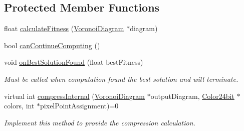 \subsection*{Protected Member Functions}
\begin{DoxyCompactItemize}
\item 
float \hyperlink{classlossycompressor_1_1_compressor_algorithm_af77bb3da1cfcf14c0bed2aa254c4fbd6}{calculate\+Fitness} (\hyperlink{structlossycompressor_1_1_voronoi_diagram}{Voronoi\+Diagram} $\ast$diagram)
\item 
bool \hyperlink{classlossycompressor_1_1_compressor_algorithm_a978361a0f3a5c36d3a82a6fe1b4c4d00}{can\+Continue\+Computing} ()
\item 
void \hyperlink{classlossycompressor_1_1_compressor_algorithm_ac7ce717ecc67256fbc99d9ab8a0569fe}{on\+Best\+Solution\+Found} (float best\+Fitness)\hypertarget{classlossycompressor_1_1_compressor_algorithm_ac7ce717ecc67256fbc99d9ab8a0569fe}{}\label{classlossycompressor_1_1_compressor_algorithm_ac7ce717ecc67256fbc99d9ab8a0569fe}

\begin{DoxyCompactList}\small\item\em Must be called when computation found the best solution and will terminate. \end{DoxyCompactList}\item 
virtual int \hyperlink{classlossycompressor_1_1_compressor_algorithm_a171b7c408749b37c5526fb6bca9e981e}{compress\+Internal} (\hyperlink{structlossycompressor_1_1_voronoi_diagram}{Voronoi\+Diagram} $\ast$output\+Diagram, \hyperlink{structlossycompressor_1_1_color24bit}{Color24bit} $\ast$colors, int $\ast$pixel\+Point\+Assignment)=0\hypertarget{classlossycompressor_1_1_compressor_algorithm_a171b7c408749b37c5526fb6bca9e981e}{}\label{classlossycompressor_1_1_compressor_algorithm_a171b7c408749b37c5526fb6bca9e981e}

\begin{DoxyCompactList}\small\item\em Implement this method to provide the compression calculation. \end{DoxyCompactList}\end{DoxyCompactItemize}

